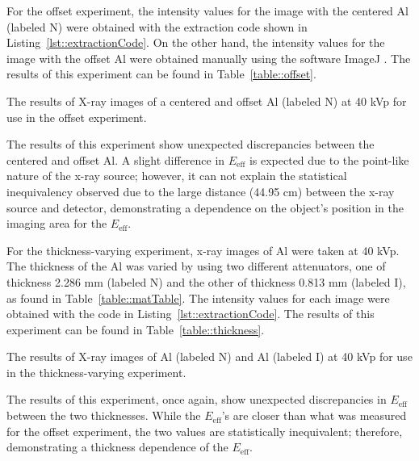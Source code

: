 \par For the offset experiment, the intensity values for the image with the centered Al (labeled N) were obtained with the extraction code shown in Listing~\ref{lst::extractionCode}. On the other hand, the intensity values for the image with the offset Al were obtained manually using the software ImageJ \cite{ImageJ}. The results of this experiment can be found in Table~\ref{table::offset}.


\begin{table}[H]
    \small
    \noindent\makebox[\textwidth]{%
    
    }
    \caption{The results of X-ray images of a centered and offset Al (labeled N) at 40 kVp for use in the offset experiment.}
    \label{table::offset}
\end{table}

\par The results of this experiment show unexpected discrepancies between the centered and offset Al. A slight difference in $E_{\text{eff}}$ is expected due to the point-like nature of the x-ray source; however, it can not explain the statistical inequivalency observed due to the large distance (44.95 cm)\cite{CArm} between the x-ray source and detector, demonstrating a dependence on the object's position in the imaging area for the $E_{\text{eff}}$.

\par For the thickness-varying experiment, x-ray images of Al were taken at 40 kVp. The thickness of the Al was varied by using two different attenuators, one of thickness 2.286 mm (labeled N) and the other of thickness 0.813 mm (labeled I), as found in Table~\ref{table::matTable}. The intensity values for each image were obtained with the code in Listing~\ref{lst::extractionCode}. The results of this experiment can be found in Table~\ref{table::thickness}.

\begin{table}[H]
    \small
    \noindent\makebox[\textwidth]{%
    
    }
    \caption{The results of X-ray images of Al (labeled N) and Al (labeled I) at 40 kVp for use in the thickness-varying experiment.}
   	\label{table::thickness}
\end{table}

\par The results of this experiment, once again, show unexpected discrepancies in $E_{\text{eff}}$ between the two thicknesses. While the $E_{\text{eff}}$'s are closer than what was measured for the offset experiment, the two values are statistically inequivalent; therefore, demonstrating a thickness dependence of the $E_{\text{eff}}$.

